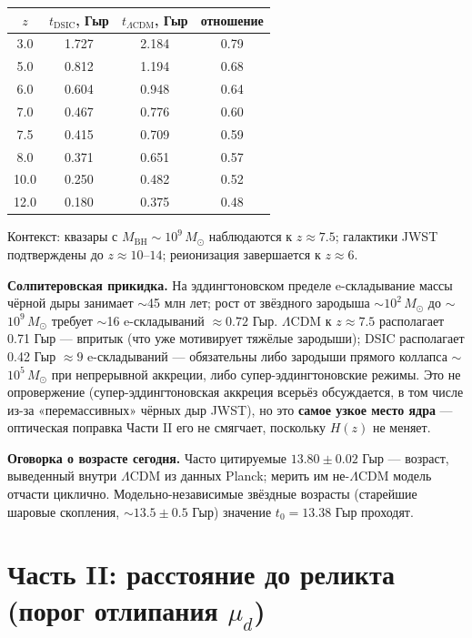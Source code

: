 \documentclass{article}
\begin{document}
\begin{center}
\small
\begin{tabular}{@{}cccc@{}}
\toprule
$z$ & $t_{\text{DSIC}}$, Гыр & $t_{\Lambda\text{CDM}}$, Гыр & отношение \\
\midrule
3.0 & 1.727 & 2.184 & 0.79 \\
5.0 & 0.812 & 1.194 & 0.68 \\
6.0 & 0.604 & 0.948 & 0.64 \\
7.0 & 0.467 & 0.776 & 0.60 \\
7.5 & 0.415 & 0.709 & 0.59 \\
8.0 & 0.371 & 0.651 & 0.57 \\
10.0 & 0.250 & 0.482 & 0.52 \\
12.0 & 0.180 & 0.375 & 0.48 \\
\bottomrule
\end{tabular}
\end{center}

Контекст: квазары с $M_{\text{BH}} \sim 10^9\,M_\odot$ наблюдаются к $z \approx 7.5$; галактики JWST подтверждены до $z \approx 10\text{--}14$; реионизация завершается к $z \approx 6$.

\textbf{Солпитеровская прикидка.} На эддингтоновском пределе e-складывание массы чёрной дыры занимает $\sim$45 млн лет; рост от звёздного зародыша $\sim$$10^2\,M_\odot$ до $\sim$$10^9\,M_\odot$ требует $\sim$16 e-складываний $\approx 0.72$ Гыр. $\Lambda$CDM к $z \approx 7.5$ располагает 0.71 Гыр --- впритык (что уже мотивирует тяжёлые зародыши); DSIC располагает 0.42 Гыр $\approx 9$ e-складываний --- обязательны либо зародыши прямого коллапса $\sim$$10^5\,M_\odot$ при непрерывной аккреции, либо супер-эддингтоновские режимы. Это не опровержение (супер-эддингтоновская аккреция всерьёз обсуждается, в том числе из-за «перемассивных» чёрных дыр JWST), но это \textbf{самое узкое место ядра} --- оптическая поправка Части II его не смягчает, поскольку $H(z)$ не меняет.

\textbf{Оговорка о возрасте сегодня.} Часто цитируемые $13.80 \pm 0.02$ Гыр --- возраст, выведенный внутри $\Lambda$CDM из данных Planck; мерить им не-$\Lambda$CDM модель отчасти циклично. Модельно-независимые звёздные возрасты (старейшие шаровые скопления, $\sim$$13.5 \pm 0.5$ Гыр) значение $t_0 = 13.38$ Гыр проходят.
\section{Часть II: расстояние до реликта (порог отлипания $\mu_d$)}
\end{document}
